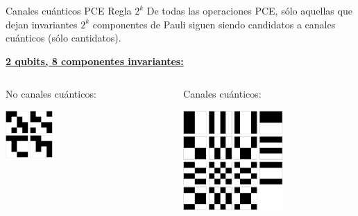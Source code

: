 \documentclass[xcolor=dvipsnames,presentation]{beamer}%
\begin{document}
\begin{frame}{Canales cuánticos PCE}
{Regla $2^k$}
De todas las operaciones PCE, sólo aquellas que dejan 
invariantes $2^k$ componentes de Pauli siguen siendo 
candidatos a canales cuánticos (\alert{sólo cantidatos}).

\vspace{.4cm}

\small{\textbf{\underline{2 qubits, 8 componentes invariantes:}}}

\vspace{.15cm}

\small{
\begin{columns}
\begin{column}{0.5\textwidth}
\hspace{.3cm}
No canales cuánticos:
\hspace{.3cm}
\begin{center}
\includegraphics[height=1.8cm]{2qubit_pceOp_8components}
\end{center}
\vspace{1.6cm}
\end{column} 
\begin{column}{0.5\textwidth}
Canales cuánticos:
\begin{center}
\includegraphics[height=3.8cm]{2qubit_pceQCh_8components}
\end{center}
\end{column}
\end{columns}}
\vspace{2cm}
\end{frame}
\end{document}
